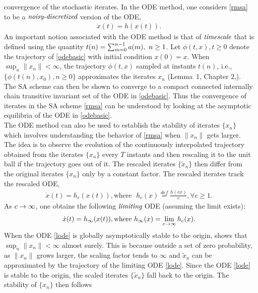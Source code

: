 convergence of the stochastic iterates. In the ODE method, one considers \eqref{rmsa} to be a 
$\emph{noisy-discretized}$ version of the ODE,
\begin{align}\label{odebasic}
\dot{x}(t)=h(x(t)).
\end{align}
An important notion associated with the ODE method is that of $\emph{timescale}$ that is
defined using the quantity $t(n)=\sum_{m=0}^{n-1} a(m),\mbox{ } n\geq 1$. Let $\phi(t,x), t\geq 0$ 
denote the trajectory of \eqref{odebasic} with initial condition $x(0)=x$. When $\sup_n\parallel
x_n\parallel <\infty$, 
the trajectory $\phi(t,x)$ sampled at instants $t(n)$, i.e., $\{\phi(t(n),x_0), n\geq 0\}$ approximates the 
iterates ${x_n}$ (Lemma~$1$, Chapter $2$,\cite{SA}). The SA scheme can then be shown to converge to a 
compact connected internally chain transitive invariant set of the ODE in \eqref{odebasic}. 
Thus the convergence of iterates in the SA scheme \eqref{rmsa} can be understood by looking at the 
asymptotic equilibria of the ODE in \eqref{odebasic}.\\
\indent
The ODE method can also be used to establish the stability of iterates $\{x_n\}$ which involves 
understanding the behavior of \eqref{rmsa} when $\parallel x_n\parallel$ gets larger. The idea is to observe
the evolution of the continuously interpolated trajectory obtained from the iterates $\{x_n\}$ every 
$T$ instants and then rescaling it to the unit ball if the trajectory goes out of it. 
The rescaled iterates $\{\tilde{x}_n\}$ then differ from the original iterates $\{x_n\}$ only by a 
constant factor. The rescaled iterates track the rescaled ODE,
\begin{align}
\dot{x}(t)=h_{c}(x(t)), \text{where}\mbox{ } h_c(x)\stackrel{def}{=}\frac{h(cx)}{c}, \forall c\geq 1.
\end{align}
As $c \rightarrow \infty$, one obtains the following $\emph{limiting}$ ODE (assuming the limit exists):
\begin{align}\label{lode}
\dot{x}(t)=h_\infty(x(t)), \text{where} \mbox{ } h_\infty(x)=\lim_{c \rightarrow \infty} h_c(x).
\end{align}
When the ODE \eqref{lode} is globally asymptotically stable to the origin, \cite{BMSTAB} shows that 
$\sup_n \parallel x_n\parallel <\infty$ almost surely. This is because outside a set of zero probability,
as $\parallel x_n\parallel$ grows larger, the scaling factor tends to $\infty$ and 
$\tilde{x}_n$ can be approximated 
by the trajectory of the limiting ODE \eqref{lode}. Since the ODE \eqref{lode} is stable to the origin, 
the scaled iterates $\{\tilde{x}_n\}$ fall back to the origin. The stability of $\{x_n\}$ then follows 

